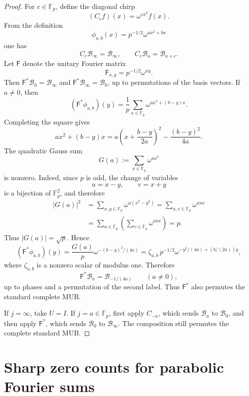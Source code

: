 \documentclass[11pt]{article}
\newcommand{\F}{\mathbb F}
\begin{document}
\begin{proof}
For \(c\in\F_p\), define the diagonal chirp
\[
 (C_cf)(x)=\omega^{cx^2}f(x).
\]
From the definition
\[
 \phi_{a,b}(x)=p^{-1/2}\omega^{ax^2+bx}
\]
one has
\[
 C_c\mathcal B_\infty=\mathcal B_\infty,
 \qquad
 C_c\mathcal B_a=\mathcal B_{a+c}.
\]
Let \(\mathsf F\) denote the unitary Fourier matrix
\[
 \mathsf F_{x,y}=p^{-1/2}\omega^{xy}.
\]
Then \(\mathsf F^*\mathcal B_0=\mathcal B_\infty\) and
\(\mathsf F^*\mathcal B_\infty=\mathcal B_0\), up to permutations of the basis
vectors.  If \(a\ne0\), then
\[
 (\mathsf F^*\phi_{a,b})(y)
 =
 \frac1p\sum_{x\in\F_p}\omega^{ax^2+(b-y)x}.
\]
Completing the square gives
\[
 ax^2+(b-y)x
 =
 a\left(x+\frac{b-y}{2a}\right)^2
 -
 \frac{(b-y)^2}{4a}.
\]
The quadratic Gauss sum
\[
 G(a):=\sum_{x\in\F_p}\omega^{ax^2}
\]
is nonzero.  Indeed, since \(p\) is odd, the change of variables
\[
 u=x-y,\qquad v=x+y
\]
is a bijection of \(\F_p^2\), and therefore
\[
 \begin{aligned}
 |G(a)|^2
 &=\sum_{x,y\in\F_p}\omega^{a(x^2-y^2)}
 =\sum_{u,v\in\F_p}\omega^{auv}\\
 &=\sum_{u\in\F_p}
   \left(\sum_{v\in\F_p}\omega^{auv}\right)
 =p.
 \end{aligned}
\]
Thus \(|G(a)|=\sqrt p\).  Hence
\[
 (\mathsf F^*\phi_{a,b})(y)
 =
 \frac{G(a)}p
 \omega^{-(b-y)^2/(4a)}
 =
 \zeta_{a,b}\,
 p^{-1/2}\omega^{-y^2/(4a)+(b/(2a))y},
\]
where \(\zeta_{a,b}\) is a nonzero scalar of modulus one.  Therefore
\[
 \mathsf F^*\mathcal B_a=\mathcal B_{-1/(4a)}
 \qquad(a\ne0),
\]
up to phases and a permutation of the second label.  Thus \(\mathsf F^*\) also
permutes the standard complete MUB.

If \(j=\infty\), take \(U=I\).  If \(j=a\in\F_p\), first apply
\(C_{-a}\), which sends \(\mathcal B_a\) to \(\mathcal B_0\), and then
apply \(\mathsf F^*\), which sends \(\mathcal B_0\) to
\(\mathcal B_\infty\).  The composition still permutes the complete
standard MUB.
\end{proof}


\section{Sharp zero counts for parabolic Fourier sums}
\label{sec:parabolic-exact}
\end{document}
